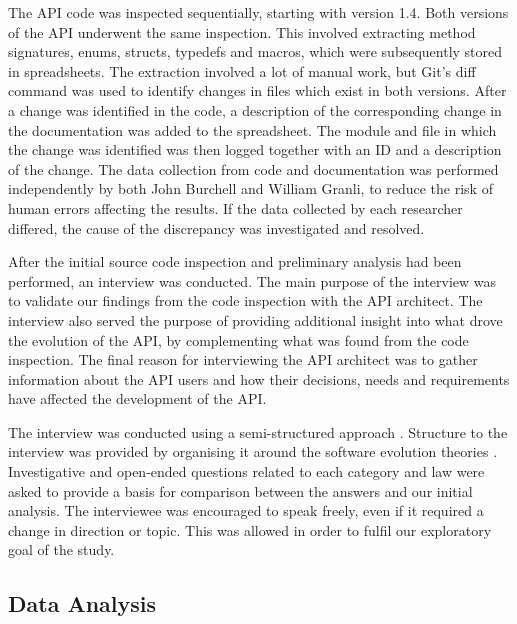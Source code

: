 \documentclass{sig-alternate}
\begin{document}
The API code was inspected sequentially, starting with version 1.4. Both versions of the API underwent the same inspection. This involved extracting method signatures, enums, structs, typedefs and macros, which were subsequently stored in spreadsheets. The extraction involved a lot of manual work, but Git's \cite{git} diff command was used to identify changes in files which exist in both versions. After a change was identified in the code, a description of the corresponding change in the documentation was added to the spreadsheet. The module and file in which the change was identified was then logged together with an ID and a description of the change. The data collection from code and documentation was performed independently by both John Burchell and William Granli, to reduce the risk of human errors affecting the results. If the data collected by each researcher differed, the cause of the discrepancy was investigated and resolved. 

After the initial source code inspection and preliminary analysis had been performed, an interview was conducted. The main purpose of the interview was to validate our findings from the code inspection with the API architect. The interview also served the purpose of providing additional insight into what drove the evolution of the API, by complementing what was found from the code inspection. The final reason for interviewing the API architect was to gather information about the API users and how their decisions, needs and requirements have affected the development of the API. 

The interview was conducted using a semi-structured approach \cite{robson2002real}. Structure to the interview was provided by organising it around the software evolution theories \cite{chapin2001types} \cite{lehman1980programs}. Investigative and open-ended questions related to each category and law were asked to provide a basis for comparison between the answers and our initial analysis. The interviewee was encouraged to speak freely, even if it required a change in direction or topic. This was allowed in order to fulfil our exploratory goal of the study. 




\subsection{Data Analysis} \label{data_analysis}
\end{document}
